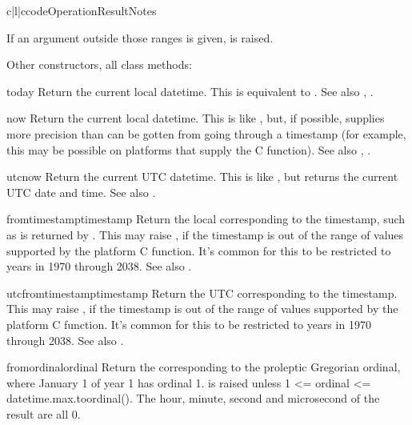 \begin{tableiii}{c|l|c}{code}{Operation}{Result}{Notes}
\begin{funcdesc}
If an argument outside those ranges is given,
 is raised.
\end{funcdesc}

Other constructors, all class methods:

\begin{methoddesc}{today}{}
    Return the current local datetime.  This is equivalent to
    .
    See also , .
\end{methoddesc}

\begin{methoddesc}{now}{}
    Return the current local datetime.  This is like ,
    but, if possible, supplies more precision than can be gotten from
    going through a  timestamp (for example,
    this may be possible on platforms that supply the C
     function).
    See also , .
\end{methoddesc}

\begin{methoddesc}{utcnow}{}
    Return the current UTC datetime.  This is like , but
    returns the current UTC date and time.
    See also .
\end{methoddesc}

\begin{methoddesc}{fromtimestamp}{timestamp}
    Return the local  corresponding to the \POSIX{}
    timestamp, such as is returned by .  This
    may raise , if the timestamp is out of the
    range of values supported by the platform C
     function.  It's common for this to be
    restricted to years in 1970 through 2038.
    See also .
\end{methoddesc}

\begin{methoddesc}{utcfromtimestamp}{timestamp}
    Return the UTC  corresponding to the \POSIX{}
    timestamp.  This may raise , if the
    timestamp is out of the range of values supported by the platform
    C  function.  It's common for this to be
    restricted to years in 1970 through 2038.
    See also .
\end{methoddesc}

\begin{methoddesc}{fromordinal}{ordinal}
    Return the  corresponding to the proleptic
    Gregorian ordinal, where January 1 of year 1 has ordinal 1.
     is raised unless 1 <= ordinal <=
    datetime.max.toordinal().  The hour, minute, second and
    microsecond of the result are all 0.
\end{methoddesc}


\end{tableiii}
